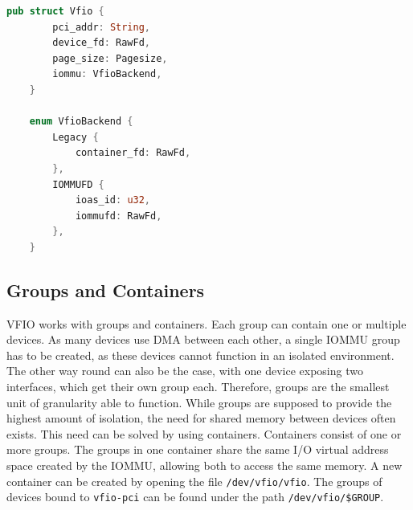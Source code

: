 \begin{minipage}{.95\linewidth}
    \begin{lstlisting}[language=Rust,caption={Structs used to model VFIO}, label=lst:vfiostructs]
    pub struct Vfio {
        pci_addr: String,
        device_fd: RawFd,
        page_size: Pagesize,
        iommu: VfioBackend,
    } 

    enum VfioBackend {
        Legacy {
            container_fd: RawFd,
        },
        IOMMUFD {
            ioas_id: u32,
            iommufd: RawFd,
        },
    }
\end{lstlisting}
\end{minipage}





\subsection{Groups and Containers}
VFIO works with groups and containers. Each group can contain one or multiple devices. As many devices use DMA between each other, a single IOMMU group has to be created, as these devices cannot function in an isolated environment. The other way round can also be the case, with one device exposing two interfaces, which get their own group each. Therefore, groups are the smallest unit of granularity able to function. While groups are supposed to provide the highest amount of isolation, the need for shared memory between devices often exists. This need can be solved by using containers. Containers consist of one or more groups. The groups in one container share the same I/O virtual address space created by the IOMMU, allowing both to access the same memory.
A new container can be created by opening the file \texttt{/dev/vfio/vfio}. The groups of devices bound to \texttt{vfio-pci} can be found under the path \texttt{/dev/vfio/\$GROUP}.

